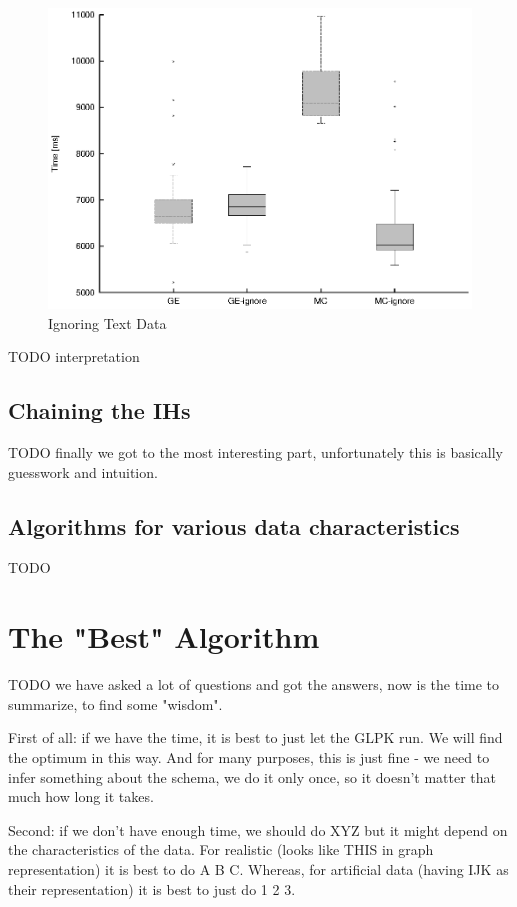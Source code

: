 \begin{figure}
  \caption{Ignoring Text Data}
  \label{image-experiment-ignore-text-data}
  \centering
    \includegraphics[width=\textwidth]{images/experiments/ignore-text-data}
\end{figure}

TODO interpretation

\subsection{Chaining the IHs}

TODO finally we got to the most interesting part, unfortunately this is basically guesswork and intuition.

\subsection{Algorithms for various data characteristics}

TODO

\section{The "Best" Algorithm}

TODO we have asked a lot of questions and got the answers, now is the time to summarize, to find some "wisdom".

First of all: if we have the time, it is best to just let the GLPK run.
We will find the optimum in this way.
And for many purposes, this is just fine - we need to infer something about the schema, we do it only once, so it doesn't matter that much how long it takes.

Second: if we don't have enough time, we should do XYZ but it might depend on the characteristics of the data.
For realistic (looks like THIS in graph representation) it is best to do A B C.
Whereas, for artificial data (having IJK as their representation) it is best to just do 1 2 3.

